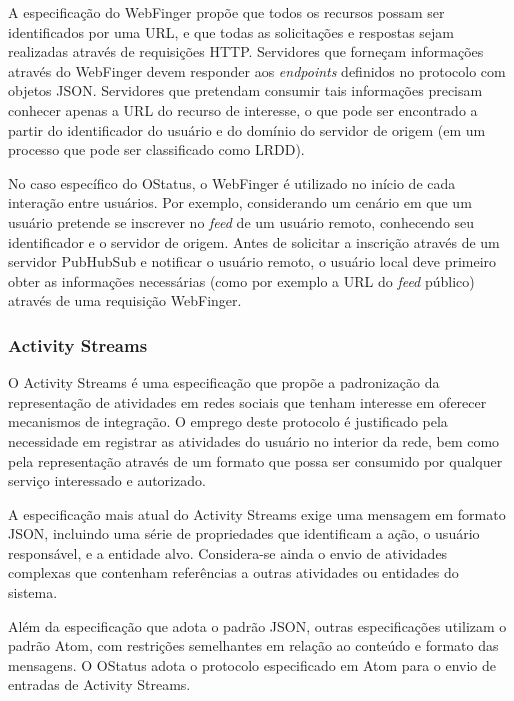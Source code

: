 A especificação do WebFinger propõe que todos os recursos possam ser identificados
por uma URL, e que todas as solicitações e respostas sejam realizadas através de
requisições HTTP. Servidores que forneçam informações através do WebFinger devem
responder aos \textit{endpoints} definidos no protocolo com objetos JSON. Servidores
que pretendam consumir tais informações precisam conhecer apenas a URL do recurso de
interesse, o que pode ser encontrado a partir do identificador do usuário e do
domínio do servidor de origem (em um processo que pode ser classificado como LRDD). 


No caso específico do OStatus, o WebFinger é utilizado no início de cada interação
entre usuários. Por exemplo, considerando um cenário em que um usuário pretende se
inscrever no \textit{feed} de um usuário remoto, conhecendo seu identificador e o
servidor de origem. Antes de solicitar a inscrição através de um servidor PubHubSub e
notificar o usuário remoto, o usuário local deve primeiro obter as informações
necessárias (como por exemplo a URL do \textit{feed} público) através de uma
requisição  WebFinger.

\subsubsection{Activity Streams}


O Activity Streams é uma especificação que propõe a padronização da representação de
atividades em redes sociais que tenham interesse em oferecer mecanismos de
integração. O emprego deste protocolo é justificado pela necessidade em registrar as
atividades do usuário no interior da rede, bem como pela representação através de um
formato que possa ser consumido por qualquer serviço interessado e autorizado.

A especificação mais atual do Activity Streams exige uma mensagem em formato JSON,
incluindo uma série de propriedades que identificam a ação, o usuário responsável, e
a entidade alvo. Considera-se ainda o envio de atividades complexas que contenham
referências a outras atividades ou entidades do sistema. 

Além da especificação que adota o padrão JSON, outras especificações utilizam o
padrão Atom, com restrições semelhantes em relação ao conteúdo e formato das
mensagens. O OStatus adota o protocolo especificado em Atom para o envio de entradas
de Activity Streams.

